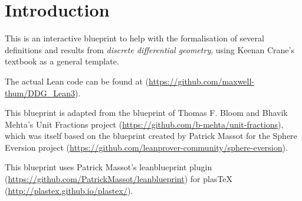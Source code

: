 \chapter*{Introduction}
\label{cha:intro}

This is an interactive blueprint to help with 
the formalisation of several definitions and results
from \emph{discrete differential geometry}, using 
Keenan Crane's textbook as a general template.

The actual Lean code can be found at (\url{https://github.com/maxwell-thum/DDG_Lean3}). %

This blueprint is adapted from the blueprint of Thomas F. Bloom and Bhavik Mehta's Unit Fractions project (\url{https://github.com/b-mehta/unit-fractions}), which was itself based on the blueprint created by Patrick Massot for the Sphere Eversion project (\url{https://github.com/leanprover-community/sphere-eversion}).

This blueprint uses Patrick Massot's leanblueprint plugin (\url{https://github.com/PatrickMassot/leanblueprint}) for plasTeX (\url{http://plastex.github.io/plastex/}). 
